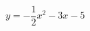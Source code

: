 \hspace*{2mm}\begin{minipage}[t]{\dimexpr\linewidth-2mm\relax}\vspace{0pt}
$y=-\dfrac{1}{2}x^2-3x-5$\end{minipage}
